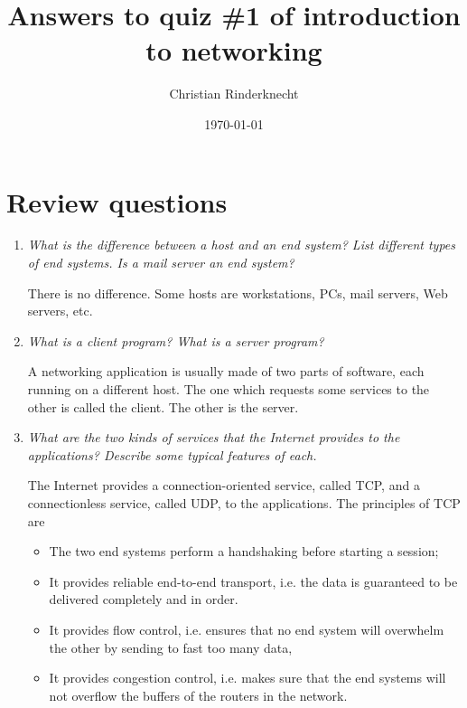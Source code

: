 \documentclass[11pt,a4paper]{article}
\title{Answers to quiz \#1 of introduction to networking}
\author{Christian Rinderknecht}
\date{\today}
\begin{document}
\maketitle

\section{Review questions}

\begin{enumerate}

  \item \emph{What is the difference between a host and an end system?
  List different types of end systems. Is a mail server an end
  system?}

  There is no difference. Some hosts are workstations, PCs, mail
  servers, Web servers, etc.

  \item \emph{What is a client program? What is a server program?}

  A networking application is usually made of two parts of software,
  each running on a different host. The one which requests some
  services to the other is called the client. The other is the
  server.

  \item \emph{What are the two kinds of services that the Internet
  provides to the applications? Describe some typical features of
  each.}

  The Internet provides a connection-oriented service, called TCP, and
  a connectionless service, called UDP, to the applications. The
  principles of TCP are
  \begin{itemize}
    \item The two end systems perform a handshaking before starting a
    session;
    
    \item It provides reliable end-to-end transport, i.e. the data is
    guaranteed to be delivered completely and in order.

    \item It provides flow control, i.e. ensures that no end system
    will overwhelm the other by sending to fast too many data,

    \item It provides congestion control, i.e. makes sure that the end
    systems will not overflow the buffers of the routers in the
    network.
  \end{itemize}


\end{enumerate}
\end{document}
